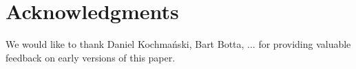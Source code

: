\section{Acknowledgments} 

We would like to thank Daniel Kochmański, Bart Botta, ...
for providing valuable feedback on early
versions of this paper.
